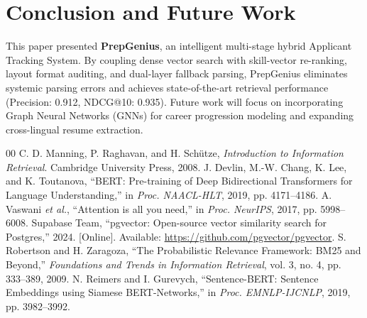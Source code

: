 \documentclass[conference]{IEEEtran}
\begin{document}
\section{Conclusion and Future Work}
This paper presented \textbf{PrepGenius}, an intelligent multi-stage hybrid Applicant Tracking System. By coupling dense vector search with skill-vector re-ranking, layout format auditing, and dual-layer fallback parsing, PrepGenius eliminates systemic parsing errors and achieves state-of-the-art retrieval performance (Precision: 0.912, NDCG@10: 0.935). Future work will focus on incorporating Graph Neural Networks (GNNs) for career progression modeling and expanding cross-lingual resume extraction.

\begin{thebibliography}{00}
 C. D. Manning, P. Raghavan, and H. Schütze, \textit{Introduction to Information Retrieval}. Cambridge University Press, 2008.
 J. Devlin, M.-W. Chang, K. Lee, and K. Toutanova, ``BERT: Pre-training of Deep Bidirectional Transformers for Language Understanding,'' in \textit{Proc. NAACL-HLT}, 2019, pp. 4171--4186.
 A. Vaswani \textit{et al.}, ``Attention is all you need,'' in \textit{Proc. NeurIPS}, 2017, pp. 5998--6008.
 Supabase Team, ``pgvector: Open-source vector similarity search for Postgres,'' 2024. [Online]. Available: \url{https://github.com/pgvector/pgvector}.
 S. Robertson and H. Zaragoza, ``The Probabilistic Relevance Framework: BM25 and Beyond,'' \textit{Foundations and Trends in Information Retrieval}, vol. 3, no. 4, pp. 333--389, 2009.
 N. Reimers and I. Gurevych, ``Sentence-BERT: Sentence Embeddings using Siamese BERT-Networks,'' in \textit{Proc. EMNLP-IJCNLP}, 2019, pp. 3982--3992.
\end{thebibliography}
\end{document}
